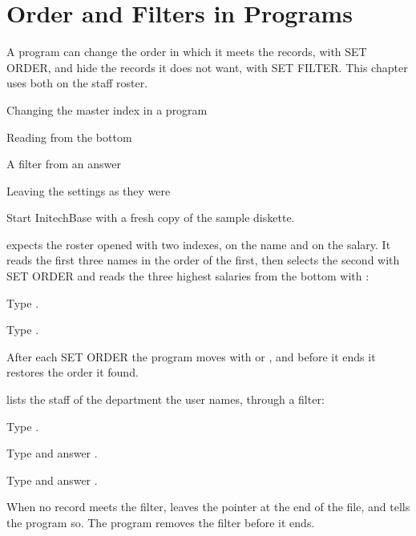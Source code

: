\chapter{Order and Filters in Programs}
A program can change the order in which it meets the records, with SET
ORDER, and hide the records it does not want, with SET FILTER.  This chapter
uses both on the staff roster.

\begin{ChapterCovers}
\item Changing the master index in a program
\item Reading from the bottom
\item A filter from an answer
\item Leaving the settings as they were
\end{ChapterCovers}

Start InitechBase with a fresh copy of the sample diskette.

 expects the roster opened with two indexes, on the name and
on the salary.  It reads the first three names in the order of the first, then
selects the second with SET ORDER and reads the three highest salaries from the
bottom with :
\begin{Steps}
\item Type .
\item Type .
\end{Steps}
After each SET ORDER the program moves with  or , and
before it ends it restores the order it found.

 lists the staff of the department the user names, through a
filter:
\begin{Steps}
\item Type .
\item Type  and answer .
\item Type  and answer .
\end{Steps}
When no record meets the filter,  leaves the pointer at the end of
the file, and  tells the program so.  The program removes the filter
before it ends.

